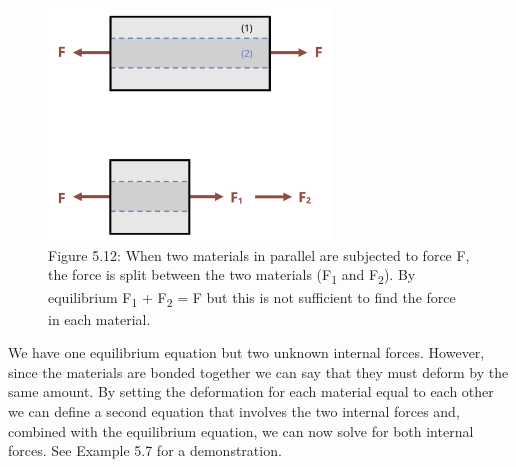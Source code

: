 \documentclass[
  letterpaper,
  DIV=11,
  numbers=noendperiod]{scrreprt}
\theoremstyle{definition}
\theoremstyle{remark}
\begin{document}
\begin{figure}[H]

{\centering \includegraphics[width=2.94792in,height=\textheight]{images/PNGs/Figure 5.13.png}

}

\caption{Figure 5.12: When two materials in parallel are subjected to
force F, the force is split between the two materials
(F\textsubscript{1} and F\textsubscript{2}). By equilibrium
F\textsubscript{1} + F\textsubscript{2} = F but this is not sufficient
to find the force in each material.}

\end{figure}%

We have one equilibrium equation but two unknown internal forces.
However, since the materials are bonded together we can say that they
must deform by the same amount. By setting the deformation for each
material equal to each other we can define a second equation that
involves the two internal forces and, combined with the equilibrium
equation, we can now solve for both internal forces. See Example 5.7 for
a demonstration.
\end{document}
